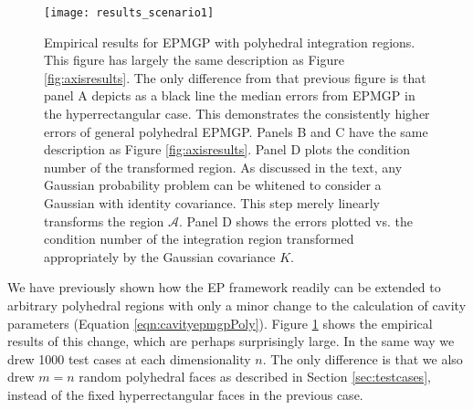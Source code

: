 \documentclass[twoside,11pt]{article}
\def\regionA{\mathcal{A}}
\begin{document}
%
\begin{figure}
\centering
\hspace{0.0cm}
\texttt{[image: results\_scenario1]}
\caption{\small{Empirical results for EPMGP with polyhedral integration regions.  This figure has largely the same description as Figure \ref{fig:axisresults}.  The only difference from that previous figure is that panel A depicts as a black line the median errors from EPMGP in the hyperrectangular case.  This demonstrates the consistently higher errors of general polyhedral EPMGP.  Panels B and C have the same description as Figure \ref{fig:axisresults}.  Panel D plots the condition number of the transformed region.  As discussed in the text, any Gaussian probability problem can be whitened to consider a Gaussian with identity covariance.  This step merely linearly transforms the region $\regionA$.  Panel D shows the errors plotted vs. the condition number of the integration region transformed appropriately by the Gaussian covariance $K$.}}
\label{fig:generalresults} %
\end{figure}
%
We have previously shown how the EP framework readily can be extended to arbitrary polyhedral regions with only a minor change to the calculation of cavity parameters (Equation \ref{eqn:cavityepmgpPoly}).  Figure \ref{fig:generalresults} shows the empirical results of this change, which are perhaps surprisingly large.  In the same way we drew 1000 test cases at each dimensionality $n$.  The only difference is that we also drew $m = n$ random polyhedral faces as described in Section \ref{sec:testcases}, instead of the fixed hyperrectangular faces in the previous case.  
\end{document}

